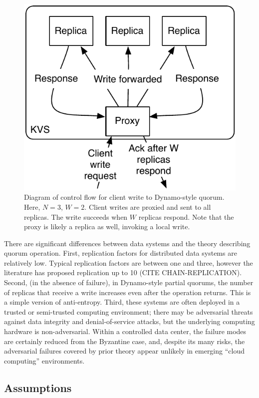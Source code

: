\documentclass{vldb}
\begin{document}
\begin{figure}
\centering
\includegraphics[width=.8\columnwidth]{figs/dynamo-quorum.pdf}
\caption{Diagram of control flow for client write to Dynamo-style
  quorum.  Here, $N=3$, $W=2$. Client writes are proxied and sent to
  all replicas. The write succeeds when $W$ replicas respond.  Note
  that the proxy is likely a replica as well, invoking a local write.}
\label{fig:dynamo-quorum}
\end{figure}

There are significant differences between data systems and the theory
describing quorum operation.  First, replication factors for
distributed data systems are relatively low.  Typical replication
factors are between one and three, however the literature has proposed
replication up to 10 (CITE CHAIN-REPLICATION).  Second, (in the
absence of failure), in Dynamo-style partial quorums, the number of
replicas that receive a write increases even after the operation
returns.  This is a simple version of anti-entropy.  Third, these
systems are often deployed in a trusted or semi-trusted computing
environment; there may be adversarial threats against data integrity
and denial-of-service attacks, but the underlying computing hardware
is non-adversarial. Within a controlled data center, the failure modes
are certainly reduced from the Byzantine case, and, despite its many
risks, the adversarial failures covered by prior theory appear
unlikely in emerging ``cloud computing'' environments.

\subsection{Assumptions}
\end{document}
